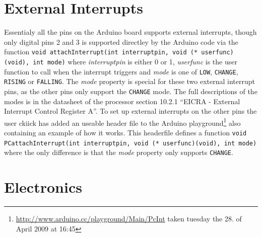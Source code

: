 \documentclass[a4paper,oneside, draft]{memoir}
\begin{document}
\section{External Interrupts}

Essentialy all the pins on the Arduino board supports external
interrupts, though only digital pins 2 and 3 is supported directley by
the Arduino code via the function \texttt{void attachInterrupt(int
  interruptpin, void (* userfunc)(void), int mode)} where
\textit{interruptpin} is either 0 or 1, \textit{userfunc} is the user
function to call when the interrupt triggers and \textit{mode} is one
of \texttt{LOW}, \texttt{CHANGE}, \texttt{RISING} or
\texttt{FALLING}. The \textit{mode} property is special for these two
external interrupt pins, as the other pins only support the
\texttt{CHANGE} mode. The full descriptions of the modes is in the
datasheet of the processor section 10.2.1 ``EICRA - External Interrupt
Control Register A''. To set up external interrupts on the other pins
the user ckiick has added an useable header file to the Arduino
playground\footnote{\url{http://www.arduino.cc/playground/Main/PcInt}
  taken tuesday the 28. of April 2009 at 16:45} also containing an
example of how it works. This headerfile defines a function
\texttt{void PCattachInterrupt(int interruptpin, void (*
  userfunc)(void), int mode)} where the only difference is that the
\textit{mode} property only supports \texttt{CHANGE}.


\section{Electronics}
\end{document}
